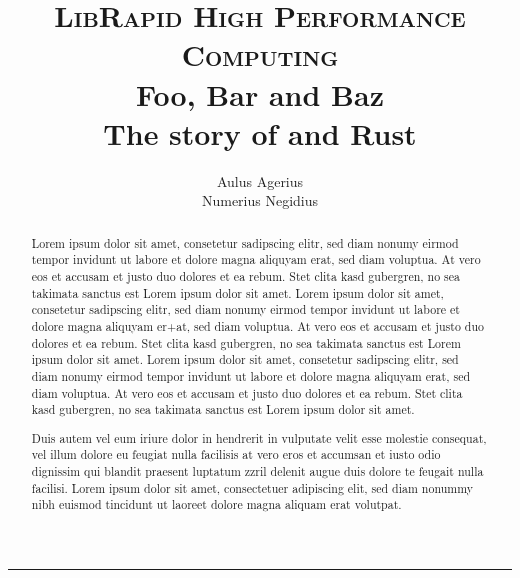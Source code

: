 \documentclass[10pt,a4paper]{article}
\title{
\textsc{LibRapid High Performance Computing}\\[2.2cm]


{\LARGE \bfseries
Foo, Bar and Baz}\\
{\Large\bfseries
The story of \CC and Rust}
}
\author{Aulus Agerius\\[0.2cm]Numerius Negidius }
\date{\monthyeardate}
\begin{document}
\maketitle
\thispagestyle{empty}
\vspace{0.5cm}
\hrule
\vspace{1cm}
\begin{abstract} %
Lorem ipsum dolor sit amet, consetetur sadipscing elitr, sed diam nonumy eirmod tempor invidunt ut labore et dolore magna aliquyam erat, sed diam voluptua. At vero eos et accusam et justo duo dolores et ea rebum. Stet clita kasd gubergren, no sea takimata sanctus est Lorem ipsum dolor sit amet. Lorem ipsum dolor sit amet, consetetur sadipscing elitr, sed diam nonumy eirmod tempor invidunt ut labore et dolore magna aliquyam er+at, sed diam voluptua. At vero eos et accusam et justo duo dolores et ea rebum. Stet clita kasd gubergren, no sea takimata sanctus est Lorem ipsum dolor sit amet. Lorem ipsum dolor sit amet, consetetur sadipscing elitr, sed diam nonumy eirmod tempor invidunt ut labore et dolore magna aliquyam erat, sed diam voluptua. At vero eos et accusam et justo duo dolores et ea rebum. Stet clita kasd gubergren, no sea takimata sanctus est Lorem ipsum dolor sit amet.   

Duis autem vel eum iriure dolor in hendrerit in vulputate velit esse molestie consequat, vel illum dolore eu feugiat nulla facilisis at vero eros et accumsan et iusto odio dignissim qui blandit praesent luptatum zzril delenit augue duis dolore te feugait nulla facilisi. Lorem ipsum dolor sit amet, consectetuer adipiscing elit, sed diam nonummy nibh euismod tincidunt ut laoreet dolore magna aliquam erat volutpat.
\end{abstract}
\vfill
\newpage
\end{document}
